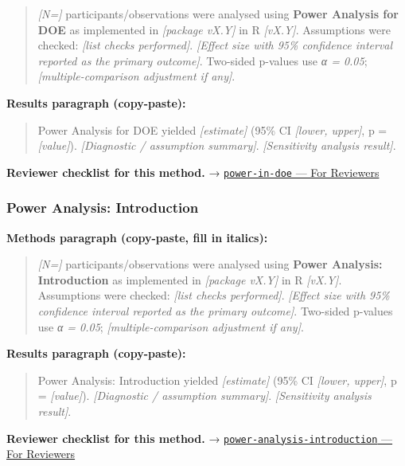 \documentclass[
]{article}
\begin{document}
\begin{quote}
\emph{{[}N={]}} participants/observations were analysed using
\textbf{Power Analysis for DOE} as implemented in \emph{{[}package
vX.Y{]}} in R \emph{{[}vX.Y{]}}. Assumptions were checked: \emph{{[}list
checks performed{]}}. \emph{{[}Effect size with 95\% confidence interval
reported as the primary outcome{]}}. Two-sided p-values use \emph{α =
0.05}; \emph{{[}multiple-comparison adjustment if any{]}}.
\end{quote}

\textbf{Results paragraph (copy-paste):}

\begin{quote}
Power Analysis for DOE yielded \emph{{[}estimate{]}} (95\% CI
\emph{{[}lower, upper{]}}, p = \emph{{[}value{]}}). \emph{{[}Diagnostic
/ assumption summary{]}}. \emph{{[}Sensitivity analysis result{]}}.
\end{quote}

\textbf{Reviewer checklist for this method.} →
\href{../chapters/16-design/power-in-doe.Rmd\#for-reviewers}{\texttt{power-in-doe}
--- For Reviewers}

\subsubsection{Power Analysis:
Introduction}\label{power-analysis-introduction}

\textbf{Methods paragraph (copy-paste, fill in italics):}

\begin{quote}
\emph{{[}N={]}} participants/observations were analysed using
\textbf{Power Analysis: Introduction} as implemented in \emph{{[}package
vX.Y{]}} in R \emph{{[}vX.Y{]}}. Assumptions were checked: \emph{{[}list
checks performed{]}}. \emph{{[}Effect size with 95\% confidence interval
reported as the primary outcome{]}}. Two-sided p-values use \emph{α =
0.05}; \emph{{[}multiple-comparison adjustment if any{]}}.
\end{quote}

\textbf{Results paragraph (copy-paste):}

\begin{quote}
Power Analysis: Introduction yielded \emph{{[}estimate{]}} (95\% CI
\emph{{[}lower, upper{]}}, p = \emph{{[}value{]}}). \emph{{[}Diagnostic
/ assumption summary{]}}. \emph{{[}Sensitivity analysis result{]}}.
\end{quote}

\textbf{Reviewer checklist for this method.} →
\href{../chapters/05-power/power-analysis-introduction.Rmd\#for-reviewers}{\texttt{power-analysis-introduction}
--- For Reviewers}
\end{document}
